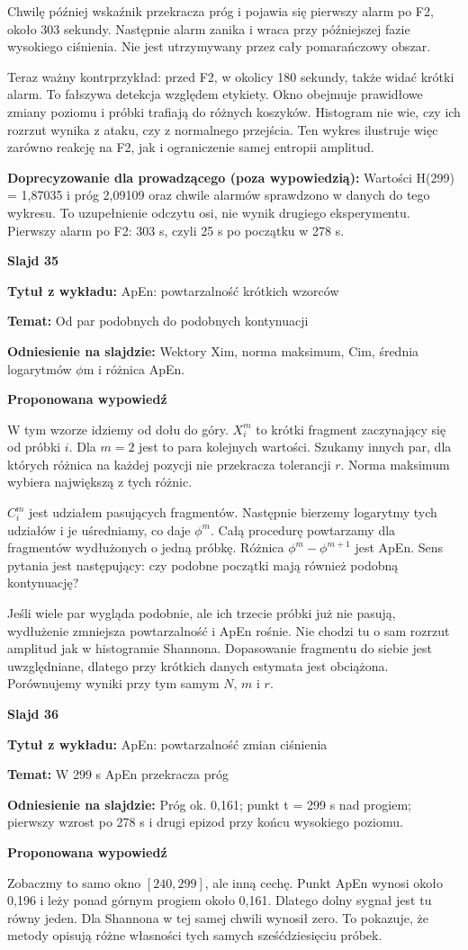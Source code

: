 \documentclass[a4paper,11pt]{article}
\newcommand{\NumerSlajdu}{1}
\newcommand{\Komentarz}[3]{%
  \gdef\NumerSlajdu{#1}%
  {\Large\bfseries Slajd #1\par}\smallskip
  \textbf{Tytuł z wykładu:} #2\par
  \textbf{Temat:} #3\par\medskip
}
\begin{document}
Chwilę później wskaźnik przekracza próg i pojawia się pierwszy alarm po F2, około 303 sekundy. Następnie alarm zanika i wraca przy późniejszej fazie wysokiego ciśnienia. Nie jest utrzymywany przez cały pomarańczowy obszar.

Teraz ważny kontrprzykład: przed F2, w okolicy 180 sekundy, także widać krótki alarm. To fałszywa detekcja względem etykiety. Okno obejmuje prawidłowe zmiany poziomu i próbki trafiają do różnych koszyków. Histogram nie wie, czy ich rozrzut wynika z ataku, czy z normalnego przejścia. Ten wykres ilustruje więc zarówno reakcję na F2, jak i ograniczenie samej entropii amplitud.

{\small\color{black!65}\textbf{Doprecyzowanie dla prowadzącego (poza wypowiedzią):} Wartości H(299) = 1,87035 i próg 2,09109 oraz chwile alarmów sprawdzono w danych do tego wykresu. To uzupełnienie odczytu osi, nie wynik drugiego eksperymentu. Pierwszy alarm po F2: 303 s, czyli 25 s po początku w 278 s.\par}
\clearpage

\Komentarz{35}{ApEn: powtarzalność krótkich wzorców}{Od par podobnych do podobnych kontynuacji}
{\small\color{black!65}\textbf{Odniesienie na slajdzie:} Wektory Xim, norma maksimum, Cim, średnia logarytmów \ensuremath{\phi}m i różnica ApEn.\par}
\medskip
\textbf{Proponowana wypowiedź}\par
W tym wzorze idziemy od dołu do góry. $X_i^m$ to krótki fragment zaczynający się od próbki $i$. Dla $m=2$ jest to para kolejnych wartości. Szukamy innych par, dla których różnica na każdej pozycji nie przekracza tolerancji $r$. Norma maksimum wybiera największą z tych różnic.

$C_i^m$ jest udziałem pasujących fragmentów. Następnie bierzemy logarytmy tych udziałów i je uśredniamy, co daje $\phi^m$. Całą procedurę powtarzamy dla fragmentów wydłużonych o jedną próbkę. Różnica $\phi^m-\phi^{m+1}$ jest ApEn. Sens pytania jest następujący: czy podobne początki mają również podobną kontynuację?

Jeśli wiele par wygląda podobnie, ale ich trzecie próbki już nie pasują, wydłużenie zmniejsza powtarzalność i ApEn rośnie. Nie chodzi tu o sam rozrzut amplitud jak w histogramie Shannona. Dopasowanie fragmentu do siebie jest uwzględniane, dlatego przy krótkich danych estymata jest obciążona. Porównujemy wyniki przy tym samym $N$, $m$ i $r$.
\clearpage

\Komentarz{36}{ApEn: powtarzalność zmian ciśnienia}{W 299 s ApEn przekracza próg}
{\small\color{black!65}\textbf{Odniesienie na slajdzie:} Próg ok. 0,161; punkt t = 299 s nad progiem; pierwszy wzrost po 278 s i drugi epizod przy końcu wysokiego poziomu.\par}
\medskip
\textbf{Proponowana wypowiedź}\par
Zobaczmy to samo okno $[240,299]$, ale inną cechę. Punkt ApEn wynosi około 0,196 i leży ponad górnym progiem około 0,161. Dlatego dolny sygnał jest tu równy jeden. Dla Shannona w tej samej chwili wynosił zero. To pokazuje, że metody opisują różne własności tych samych sześćdziesięciu próbek.
\end{document}
